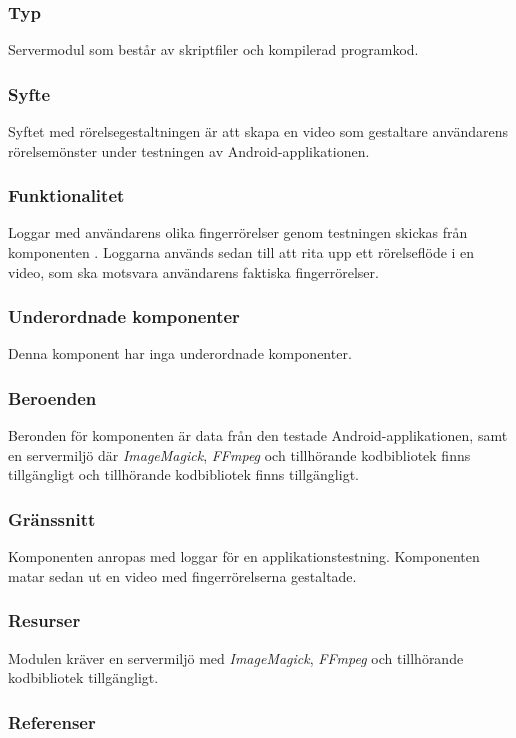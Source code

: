 \subsubsection{Typ}
Servermodul som består av skriptfiler och kompilerad programkod.

\subsubsection{Syfte}
Syftet med rörelsegestaltningen är att skapa en video som gestaltare användarens rörelsemönster under testningen av Android-applikationen.

\subsubsection{Funktionalitet}
Loggar med användarens olika fingerrörelser genom testningen skickas från komponenten . Loggarna används sedan till att rita upp ett rörelseflöde i en video, som ska motsvara användarens faktiska fingerrörelser.

\subsubsection{Underordnade komponenter}
Denna komponent har inga underordnade komponenter.

\subsubsection{Beroenden}
Beronden för komponenten är data från den testade Android-applikationen, samt en servermiljö där \textit{ImageMagick}, \textit{FFmpeg} och tillhörande kodbibliotek finns tillgängligt och tillhörande kodbibliotek finns tillgängligt.

\subsubsection{Gränssnitt}
Komponenten anropas med loggar för en applikationstestning. Komponenten matar sedan ut en video med fingerrörelserna gestaltade.

\subsubsection{Resurser}
Modulen kräver en servermiljö med \textit{ImageMagick}, \textit{FFmpeg} och tillhörande kodbibliotek tillgängligt.

\subsubsection{Referenser}

